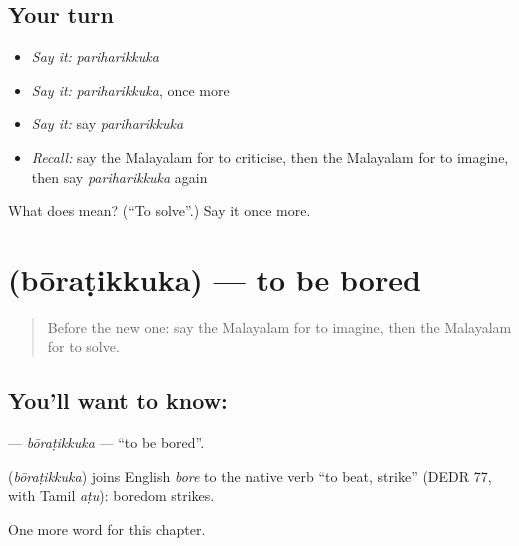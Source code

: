 \subsection*{Your turn}
\begin{itemize}
\raggedright
  \item \emph{Say it:} \emph{pariharikkuka}
  \item \emph{Say it:} \emph{pariharikkuka}, once more
  \item \emph{Say it:} say \emph{pariharikkuka}
  \item \emph{Recall:} say the Malayalam for to criticise, then the Malayalam for to imagine, then say \emph{pariharikkuka} again
\end{itemize}

\begin{tcolorbox}[breakable,colback=teal!4,colframe=teal!35!black,title={Before you move on}]
What does  mean? (\textquotedblleft{}To solve\textquotedblright{}.) Say it once more.
\end{tcolorbox}
\section[\texorpdfstring{\ml{ബോറടിക്കുക} (bōraṭikkuka)}{ബോറടിക്കുക (bōraṭikkuka)}]{ (bōraṭikkuka) — to be bored}

\label{lesson:ML-C230-boratikkuka}



\begin{quote}
Before the new one: say the Malayalam for to imagine, then the Malayalam for to solve.
\end{quote}

\subsection*{You'll want to know: }
\textbf{} — \emph{bōraṭikkuka} — \textquotedblleft{}to be bored\textquotedblright{}.

\begin{cousinweb}
\textbf{} (\emph{bōraṭikkuka}) joins English \emph{bore} to the native verb \textquotedblleft{}to beat, strike\textquotedblright{} (DEDR 77, with Tamil \emph{aṭu}): boredom strikes.
\end{cousinweb}

\begin{grammarlens}[title={What you've built}]
One more word for this chapter.
\end{grammarlens}


